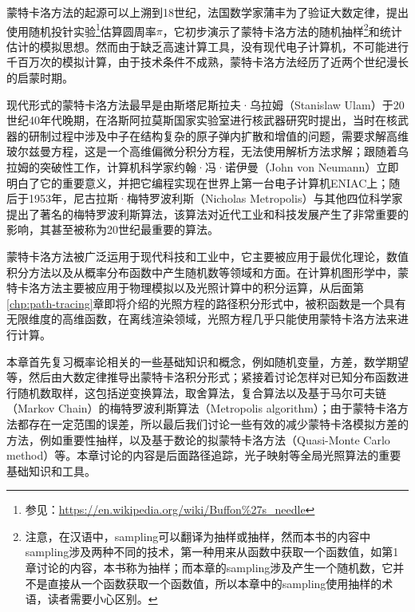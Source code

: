 蒙特卡洛方法的起源可以上溯到18世纪，法国数学家蒲丰为了验证大数定律，提出使用随机投针实验\footnote{参见：\url{https://en.wikipedia.org/wiki/Buffon\%27s_needle}}估算圆周率$\pi$，它初步演示了蒙特卡洛方法的随机抽样\footnote{注意，在汉语中，sampling可以翻译为抽样或抽样，然而本书的内容中sampling涉及两种不同的技术，第一种用来从函数中获取一个函数值，如第1章讨论的内容，本书称为抽样；而本章的sampling涉及产生一个随机数，它并不是直接从一个函数获取一个函数值，所以本章中的sampling使用抽样的术语，读者需要小心区别。}和统计估计的模拟思想。然而由于缺乏高速计算工具，没有现代电子计算机，不可能进行千百万次的模拟计算，由于技术条件不成熟，蒙特卡洛方法经历了近两个世纪漫长的启蒙时期。

现代形式的蒙特卡洛方法最早是由斯塔尼斯拉夫·乌拉姆（Stanislaw Ulam）于20世纪40年代晚期，在洛斯阿拉莫斯国家实验室进行核武器研究时提出，当时在核武器的研制过程中涉及中子在结构复杂的原子弹内扩散和增值的问题，需要求解高维玻尔兹曼方程，这是一个高维偏微分积分方程，无法使用解析方法求解；跟随着乌拉姆的突破性工作，计算机科学家约翰·冯·诺伊曼（John von Neumann）立即明白了它的重要意义，并把它编程实现在世界上第一台电子计算机ENIAC上；随后于1953年，尼古拉斯·梅特罗波利斯（Nicholas Metropolis）与其他四位科学家\cite{a:EquationofStateCalculationsbyFastComputingMachines}提出了著名的梅特罗波利斯算法，该算法对近代工业和科技发展产生了非常重要的影响，其甚至被称为20世纪最重要的算法。

蒙特卡洛方法被广泛运用于现代科技和工业中，它主要被应用于最优化理论，数值积分方法以及从概率分布函数中产生随机数等领域和方面。在计算机图形学中，蒙特卡洛方法主要被应用于物理模拟以及光照计算中的积分运算，从后面第\ref{chp:path-tracing}章即将介绍的光照方程的路径积分形式中，被积函数是一个具有无限维度的高维函数，在离线渲染领域，光照方程几乎只能使用蒙特卡洛方法来进行计算。

本章首先复习概率论相关的一些基础知识和概念，例如随机变量，方差，数学期望等，然后由大数定律推导出蒙特卡洛积分形式；紧接着讨论怎样对已知分布函数进行随机数取样，这包括逆变换算法，取舍算法，复合算法以及基于马尔可夫链（Markov Chain）的梅特罗波利斯算法（Metropolis algorithm）；由于蒙特卡洛方法都存在一定范围的误差，所以最后我们讨论一些有效的减少蒙特卡洛模拟方差的方法，例如重要性抽样，以及基于数论的拟蒙特卡洛方法（Quasi-Monte Carlo method）等。本章讨论的内容是后面路径追踪，光子映射等全局光照算法的重要基础知识和工具。







